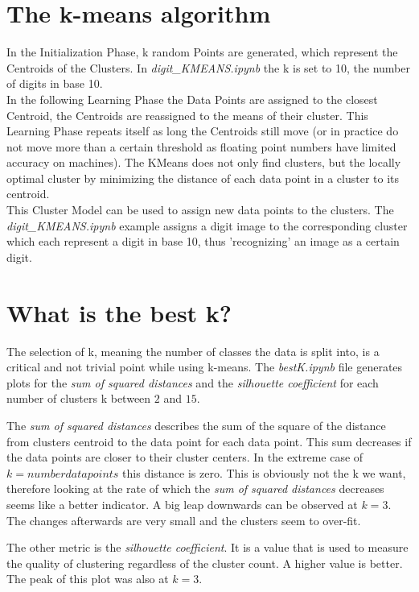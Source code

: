 \documentclass[a4paper, 11pt]{article}
\begin{document}
\section{The k-means algorithm}

In the Initialization Phase, k random Points are generated, which represent the Centroids of the Clusters. In \textit{digit\_KMEANS.ipynb} the k is set to 10, the number of digits in base 10.\\
In the following Learning Phase the Data Points are assigned to the closest Centroid, the Centroids are reassigned to the means of their cluster. This Learning Phase repeats itself as long the Centroids still move (or in practice do not move more than a certain threshold as floating point numbers have limited accuracy on machines).
The KMeans does not only find clusters, but the locally optimal cluster by minimizing the distance of each data point in a cluster to its centroid.\\
This Cluster Model can be used to assign new data points to the clusters. The \textit{digit\_KMEANS.ipynb} example assigns a digit image to the corresponding cluster which each represent a digit in base 10, thus 'recognizing' an image as a certain digit.

\section{What is the best k?}

The selection of k, meaning the number of classes the data is split into, is a critical and not trivial point while using k-means.
The \textit{bestK.ipynb} file generates plots for the \textit{sum of squared distances} and the \textit{silhouette coefficient} for each number of clusters k between $2$ and $15$.

The \textit{sum of squared distances} describes the sum of the square of the distance from clusters centroid to the data point for each data point.
This sum decreases if the data points are closer to their cluster centers.
In the extreme case of $k = number data points$ this distance is zero.
This is obviously not the k we want, therefore looking at the rate of which the \textit{sum of squared distances} decreases seems like a better indicator.
A big leap downwards can be observed at $k = 3$.
The changes afterwards are very small and the clusters seem to over-fit.

The other metric is the \textit{silhouette coefficient}.
It is a value that is used to measure the quality of clustering regardless of the cluster count.
A higher value is better.
The peak of this plot was also at $k=3$.
\end{document}
